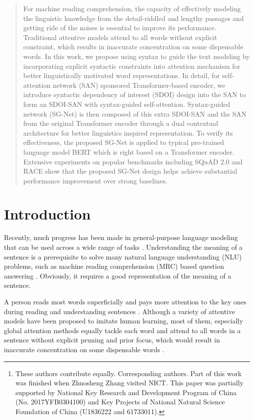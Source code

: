 \documentclass[letterpaper]{article} \usepackage{color}
\author{
	Zhuosheng Zhang\textsuperscript{\rm 1,2,3,\thanks{These authors contribute equally.  Corresponding authors. Part of this work was finished when Zhuosheng Zhang visited NICT. This paper was partially supported by National Key Research and Development Program of China (No. 2017YFB0304100) and Key Projects of National Natural Science Foundation of China (U1836222 and 61733011).}},
	Yuwei Wu\textsuperscript{\rm 1,2,3,4,*},
	Junru Zhou\textsuperscript{\rm 1,2,3},
	Sufeng Duan\textsuperscript{\rm 1,2,3}, \\
	\large \textbf{ 
		Hai Zhao\textsuperscript{\rm 1,2,3,},
		Rui Wang\textsuperscript{\rm 5,}
	}
	\\
	\textsuperscript{\rm 1}Department of Computer Science and Engineering, Shanghai Jiao Tong University\\
	\textsuperscript{\rm 2}Key Laboratory of Shanghai Education Commission for Intelligent Interaction\\
	and Cognitive Engineering, Shanghai Jiao Tong University, Shanghai, China\\
	\textsuperscript{\rm 3}MoE Key Lab of Artificial Intelligence, AI Institute, Shanghai Jiao Tong University, Shanghai, China\\
	\textsuperscript{\rm 4}College of Zhiyuan, Shanghai Jiao Tong University, China\\
	\textsuperscript{\rm 5}National Institute of Information and Communications Technology (NICT), Kyoto, Japan\\
	{\tt\{zhangzs,will8821\}@sjtu.edu.cn, zhaohai@cs.sjtu.edu.cn, wangrui@nict.go.jp} \\
}
\begin{document}
\maketitle

\begin{abstract}
For machine reading comprehension, the capacity of effectively modeling the linguistic knowledge from the detail-riddled and lengthy passages and getting ride of the noises is essential to improve its performance. Traditional attentive models attend to all words without explicit constraint, which results in inaccurate concentration on some dispensable words. In this work, we propose using syntax to guide the text modeling by incorporating explicit syntactic constraints into attention mechanism for better linguistically motivated word representations. In detail, for self-attention network (SAN) sponsored Transformer-based encoder, we introduce syntactic dependency of interest (SDOI) design into the SAN to form an SDOI-SAN with syntax-guided self-attention. Syntax-guided network (SG-Net) is then composed of this extra SDOI-SAN and the SAN from the original Transformer encoder through a dual contextual architecture for better linguistics inspired representation. To verify its effectiveness, the proposed SG-Net is applied to typical pre-trained language model BERT which is right based on a Transformer encoder. Extensive experiments on popular benchmarks including SQuAD 2.0 and RACE show that the proposed SG-Net design helps achieve substantial performance improvement over strong baselines.
\end{abstract}

\section{Introduction}
Recently, much progress has been made in general-purpose language modeling that can be used across a wide range of tasks \cite{radford2018improving,devlin2018bert,zhang2019semantics,zhou2019limit,zhang2019probing}. Understanding the meaning of a sentence is a prerequisite to solve many natural language understanding (NLU) problems, such as machine reading comprehension (MRC) based question answering \cite{Rajpurkar2018Know}. Obviously, it requires a good representation of the meaning of a sentence.

A person reads most words superficially and pays more attention to the key ones during reading and understanding sentences \cite{wang2017learning}. Although a variety of attentive models have been proposed to imitate human learning, most of them, especially global attention methods \cite{bahdanau2014neural} equally tackle each word and attend to all words in a sentence without explicit pruning and prior focus, which would result in inaccurate concentration on some dispensable words \cite{Mudrakarta2018Did}.
\end{document}
